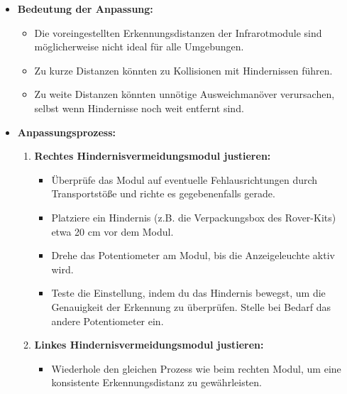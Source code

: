 \documentclass{vorlage-design-main}
\begin{document}
\begin{itemize}

\item
  \textbf{Bedeutung der Anpassung:}

  \begin{itemize}
  
  \item
    Die voreingestellten Erkennungsdistanzen der Infrarotmodule sind
    möglicherweise nicht ideal für alle Umgebungen.
  \item
    Zu kurze Distanzen könnten zu Kollisionen mit Hindernissen führen.
  \item
    Zu weite Distanzen könnten unnötige Ausweichmanöver verursachen,
    selbst wenn Hindernisse noch weit entfernt sind.
  \end{itemize}
\item
  \textbf{Anpassungsprozess:}

  \begin{enumerate}
  \def\labelenumi{\arabic{enumi}.}
  
  \item
    \textbf{Rechtes Hindernisvermeidungsmodul justieren:}

    \begin{itemize}
    
    \item
      Überprüfe das Modul auf eventuelle Fehlausrichtungen durch
      Transportstöße und richte es gegebenenfalls gerade.
    \item
      Platziere ein Hindernis (z.B. die Verpackungsbox des Rover-Kits)
      etwa 20 cm vor dem Modul.
    \item
      Drehe das Potentiometer am Modul, bis die Anzeigeleuchte aktiv
      wird.
    \item
      Teste die Einstellung, indem du das Hindernis bewegst, um die
      Genauigkeit der Erkennung zu überprüfen. Stelle bei Bedarf das
      andere Potentiometer ein.
    \end{itemize}
  \item
    \textbf{Linkes Hindernisvermeidungsmodul justieren:}

    \begin{itemize}
    
    \item
      Wiederhole den gleichen Prozess wie beim rechten Modul, um eine
      konsistente Erkennungsdistanz zu gewährleisten.
    \end{itemize}
  \end{enumerate}
\end{itemize}
\end{document}
